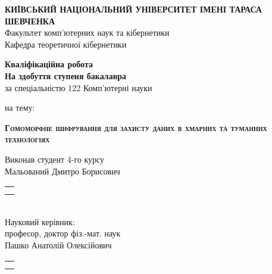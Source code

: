 \newcommand{\signature}{
{\footnotesize
\begin{tabular}{@{}p{1in}@{}}
    \hrulefill \\
    \vspace{-\baselineskip}
    \centering{(підпис)}
\end{tabular}}
}

\newpage
\begin{titlepage}
\begin{center}
\textbf{КИЇВСЬКИЙ НАЦІОНАЛЬНИЙ УНІВЕРСИТЕТ ІМЕНІ ТАРАСА ШЕВЧЕНКА}\\
Факультет комп’ютерних наук та кібернетики\\
Кафедра теоретичної кібернетики
\end{center}
\vspace{1em}
\begin{center}
\Large{\textbf{Кваліфікаційна робота}}\\
\normalsize{\textbf{На здобуття ступеня бакалавра}}\\
за спеціальністю 122 Комп’ютерні науки

\vspace{0.5em}
на тему:

\large{\textsc{\textbf{Гомоморфне шифрування для захисту даних в хмарних та туманних технологіях}}}
\end{center}
\vspace{1em}
\begin{flushleft}
Виконав студент 4-го курсу\\
Мальований Дмитро Борисович
\hspace{\fill}\signature\\
\vspace{0.5em}
Науковий керівник:\\
професор, доктор фіз.-мат. наук\\
Пашко Анатолій Олексійович
\hspace{\fill}\signature\\
\end{flushleft}


\end{titlepage}
